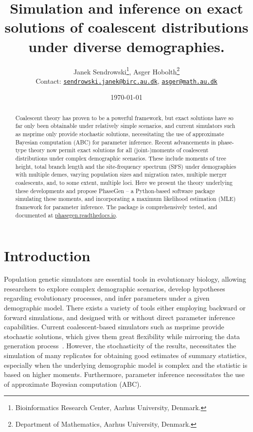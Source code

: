 \documentclass[hidelinks,11pt]{article}
\title{Simulation and inference on exact solutions of coalescent distributions under diverse demographies.}
\author{Janek Sendrowski\thanks{Bioinformatics Research Center, Aarhus University, Denmark.}, Asger Hobolth\thanks{Department of Mathematics, Aarhus University, Denmark.}\\
Contact:
\href{mailto:sendrowski.janek@birc.au.dk}{\texttt{sendrowski.janek@birc.au.dk}},
    \href{mailto:asger@math.au.dk}{\texttt{asger@math.au.dk}}}
\date{\today}
\begin{document}
    \maketitle


    \begin{abstract}
        Coalescent theory has proven to be a powerful framework, but exact solutions have so far only been obtainable under relatively simple scenarios, and current simulators such as msprime only provide stochastic solutions, necessitating the use of approximate Bayesian computation (ABC) for parameter inference.
        Recent advancements in phase-type theory now permit exact solutions for all (joint-)moments of coalescent distributions under complex demographic scenarios.
        These include moments of tree height, total branch length and the site-frequency spectrum (SFS) under demographies with multiple demes, varying population sizes and migration rates, multiple merger coalescents, and, to some extent, multiple loci.
        Here we present the theory underlying these developments and propose PhaseGen -- a Python-based software package simulating these moments, and incorporating a maximum likelihood estimation (MLE) framework for parameter inference.
        The package is comprehensively tested, and documented at \href{https://phasegen.readthedocs.io}{\url{phasegen.readthedocs.io}}.
    \end{abstract}


    \section{Introduction}\label{sec:introduction}
    Population genetic simulators are essential tools in evolutionary biology, allowing researchers to explore complex demographic scenarios, develop hypotheses regarding evolutionary processes, and infer parameters under a given demographic model.
    There exists a variety of tools either employing backward or forward simulations, and designed with or without direct parameter inference capabilities.
    Current coalescent-based simulators such as msprime provide stochastic solutions, which gives them great flexibility while mirroring the data generation process~\citep{msprime}. %
    However, the stochasticity of the results, necessitates the simulation of many replicates for obtaining good estimates of summary statistics, especially when the underlying demographic model is complex and the statistic is based on higher moments.
    Furthermore, parameter inference necessitates the use of approximate Bayesian computation (ABC).
\end{document}
